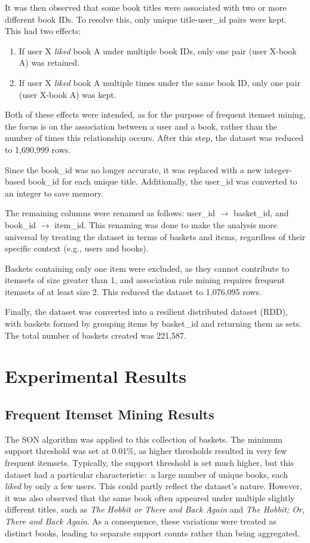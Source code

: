 \documentclass{Class/julia}
\begin{document}
It was then observed that some book titles were associated with two or more different book IDs. To resolve this, only unique title-user\_id pairs were kept. This had two effects:

\begin{enumerate}
\item If user X \textit{liked} book A under multiple book IDs, only one pair (user X-book A) was retained.
\item If user X \textit{liked} book A multiple times under the same book ID, only one pair (user X-book A) was kept.
\end{enumerate}

\noindent Both of these effects were intended, as for the purpose of frequent itemset mining, the focus is on the association between a user and a book, rather than the number of times this relationship occurs. After this step, the dataset was reduced to 1,690,999 rows.

Since the book\_id was no longer accurate, it was replaced with a new integer-based book\_id for each unique title. Additionally, the user\_id was converted to an integer to save memory.

The remaining columns were renamed as follows: user\_id $\rightarrow$ basket\_id, and book\_id $\rightarrow$ item\_id. This renaming was done to make the analysis more universal by treating the dataset in terms of baskets and items, regardless of their specific context (e.g., users and books).

Baskets containing only one item were excluded, as they cannot contribute to itemsets of size greater than 1, and association rule mining requires frequent itemsets of at least size 2. This reduced the dataset to 1,076,095 rows.

Finally, the dataset was converted into a resilient distributed dataset (RDD), with baskets formed by grouping items by basket\_id and returning them as sets. The total number of baskets created was 221,587.
 
\section{Experimental Results}\label{sec:4}

\subsection{Frequent Itemset Mining Results}

The SON algorithm was applied to this collection of baskets. The minimum support threshold was set at 0.01\%, as higher thresholds resulted in very few frequent itemsets. Typically, the support threshold is set much higher, but this dataset had a particular characteristic:\ a large number of unique books, each \textit{liked} by only a few users. This could partly reflect the dataset's nature. However, it was also observed that the same book often appeared under multiple slightly different titles, such as \textit{The Hobbit or There and Back Again} and \textit{The Hobbit; Or, There and Back Again}. As a consequence, these variations were treated as distinct books, leading to separate support counts rather than being aggregated.
\end{document}
